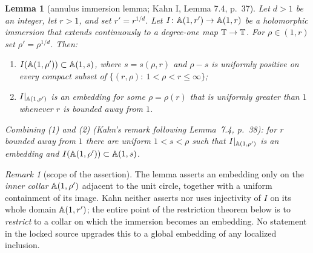\documentclass[11pt,reqno]{amsart}
\newtheorem{lemma}[theorem]{Lemma}
\theoremstyle{definition}
\theoremstyle{remark}
\newtheorem{remark}[theorem]{Remark}
\begin{document}
\begin{lemma}[annulus immersion lemma; Kahn I, Lemma 7.4, p.~37]\label{lem:kahn-ann-immerse}
Let \(d>1\) be an integer, let \(r>1\), and set \(r'=r^{1/d}\).  Let
\(I\colon\mathbb{A}(1,r')\to\mathbb{A}(1,r)\) be a holomorphic immersion that
extends continuously to a degree-one map \(\mathbb{T}\to\mathbb{T}\).  For
\(\rho\in(1,r)\) set \(\rho'=\rho^{1/d}\).  Then:
\begin{enumerate}
\item \(I(\mathbb{A}(1,\rho'))\subset\mathbb{A}(1,s)\), where \(s=s(\rho,r)\) and
\(\rho-s\) is uniformly positive on every compact subset of
\(\{(r,\rho):\ 1<\rho<r\le\infty\}\);
\item \(I|_{\mathbb{A}(1,\rho')}\) is an embedding for some \(\rho=\rho(r)\)
that is uniformly greater than \(1\) whenever \(r\) is bounded away
from \(1\).
\end{enumerate}
Combining (1) and (2) (Kahn's remark following Lemma~7.4, p.~38): for \(r\) bounded
away from \(1\) there are uniform \(1<s<\rho\) such that
\(I|_{\mathbb{A}(1,\rho')}\) is an embedding and
\(I(\mathbb{A}(1,\rho'))\subset\mathbb{A}(1,s)\).
\end{lemma}

\begin{remark}[scope of the assertion]\label{rem:ann-immerse-scope}
The lemma asserts an embedding only on the \emph{inner collar}
\(\mathbb{A}(1,\rho')\) adjacent to the unit circle, together with a uniform
containment of its image.  Kahn neither asserts nor uses injectivity of
\(I\) on its whole domain \(\mathbb{A}(1,r')\); the entire point of the
restriction theorem below is to \emph{restrict} to a collar on which
the immersion becomes an embedding.  No statement in the locked source
upgrades this to a global embedding of any localized inclusion.
\end{remark}
\end{document}
